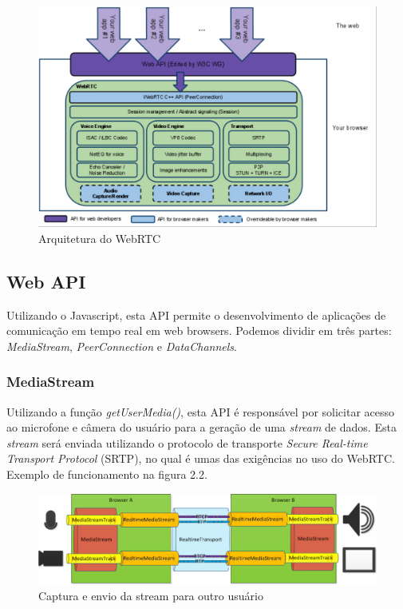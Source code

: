 \documentclass[12pt,a4paper,oneside]{report}
\begin{document}
\begin{figure}[!htdb]
 \centering
  \includegraphics[width = 1.2\linewidth]{images/webrtcArchitecture}
  \caption{Arquitetura do WebRTC} %
  \label{f_webrtcArquitetura}
\end{figure}

\subsection{Web API}
\label{ss_webApi}
Utilizando o Javascript, esta API permite o desenvolvimento de aplicações de comunicação em tempo real em web browsers. Podemos dividir em três partes: \textit{MediaStream}, \textit{PeerConnection} e \textit{DataChannels}.

\subsubsection{MediaStream}
\label{sss_mediaStream}
Utilizando a função \textit{getUserMedia()}, esta API é responsável por solicitar acesso ao microfone e câmera do usuário para a geração de uma \textit{stream} de dados. Esta \textit{stream} será enviada utilizando o protocolo de transporte \textit{Secure Real-time Transport Protocol} (SRTP), no qual é umas das exigências no uso do WebRTC. Exemplo de funcionamento na figura 2.2.

\begin{figure}[!htdb]
 \centering
  \includegraphics[width = 1.1\linewidth]{images/mediaStream}
  \caption{Captura e envio da stream para outro usuário} %
  \label{f_mediaStream}
\end{figure}
\end{document}
